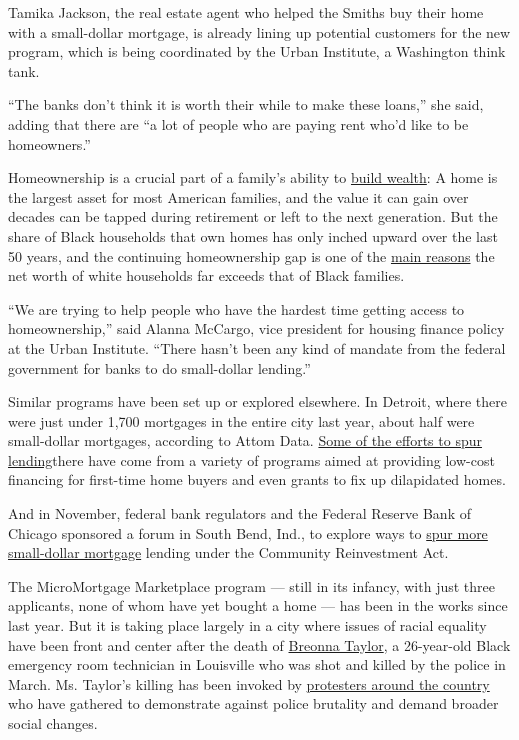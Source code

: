 Tamika Jackson, the real estate agent who helped the Smiths buy their
home with a small-dollar mortgage, is already lining up potential
customers for the new program, which is being coordinated by the Urban
Institute, a Washington think tank.

``The banks don't think it is worth their while to make these loans,''
she said, adding that there are ``a lot of people who are paying rent
who'd like to be homeowners.''

Homeownership is a crucial part of a family's ability to
\href{https://www.nytimes3xbfgragh.onion/2020/06/09/your-money/race-income-equality.html}{build
wealth}: A home is the largest asset for most American families, and the
value it can gain over decades can be tapped during retirement or left
to the next generation. But the share of Black households that own homes
has only inched upward over the last 50 years, and the continuing
homeownership gap is one of the
\href{https://www.brookings.edu/blog/up-front/2020/02/27/examining-the-black-white-wealth-gap/}{main
reasons} the net worth of white households far exceeds that of Black
families.

``We are trying to help people who have the hardest time getting access
to homeownership,'' said Alanna McCargo, vice president for housing
finance policy at the Urban Institute. ``There hasn't been any kind of
mandate from the federal government for banks to do small-dollar
lending.''

Similar programs have been set up or explored elsewhere. In Detroit,
where there were just under 1,700 mortgages in the entire city last
year, about half were small-dollar mortgages, according to Attom Data.
\href{https://www.nytimes3xbfgragh.onion/2017/11/04/business/detroit-housing.html}{Some
of the efforts to spur lending}there have come from a variety of
programs aimed at providing low-cost financing for first-time home
buyers and even grants to fix up dilapidated homes.

And in November, federal bank regulators and the Federal Reserve Bank of
Chicago sponsored a forum in South Bend, Ind., to explore ways to
\href{https://www.occ.gov/news-events/events/files/event-cra-small-dollar-mortgage-strategies-11192019.html}{spur
more small-dollar mortgage} lending under the Community Reinvestment
Act.

The MicroMortgage Marketplace program --- still in its infancy, with
just three applicants, none of whom have yet bought a home --- has been
in the works since last year. But it is taking place largely in a city
where issues of racial equality have been front and center after the
death of
\href{https://www.nytimes3xbfgragh.onion/article/breonna-taylor-police.html}{Breonna
Taylor}, a 26-year-old Black emergency room technician in Louisville who
was shot and killed by the police in March. Ms. Taylor's killing has
been invoked by
\href{https://www.nytimes3xbfgragh.onion/news-event/george-floyd-protests-minneapolis-new-york-los-angeles}{protesters
around the country} who have gathered to demonstrate against police
brutality and demand broader social changes.

